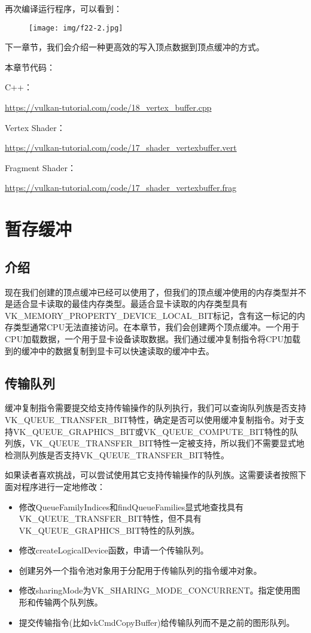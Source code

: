 \documentclass{ctexart}
\begin{document}
再次编译运行程序，可以看到：

\begin{figure}[H]
	\centering
	\texttt{[image: img/f22-2.jpg]}
\end{figure}

下一章节，我们会介绍一种更高效的写入顶点数据到顶点缓冲的方式。

本章节代码：

C++：

\url{https://vulkan-tutorial.com/code/18_vertex_buffer.cpp}

Vertex Shader：

\url{https://vulkan-tutorial.com/code/17_shader_vertexbuffer.vert}

Fragment Shader：

\url{https://vulkan-tutorial.com/code/17_shader_vertexbuffer.frag}

\newpage
\section{暂存缓冲}

\subsection{介绍}

现在我们创建的顶点缓冲已经可以使用了，但我们的顶点缓冲使用的内存类型并不是适合显卡读取的最佳内存类型。最适合显卡读取的内存类型具有VK\_MEMORY\_PROPERTY\_DEVICE\_LOCAL\_BIT标记，含有这一标记的内存类型通常CPU无法直接访问。在本章节，我们会创建两个顶点缓冲。一个用于CPU加载数据，一个用于显卡设备读取数据。我们通过缓冲复制指令将CPU加载到的缓冲中的数据复制到显卡可以快速读取的缓冲中去。

\subsection{传输队列}

缓冲复制指令需要提交给支持传输操作的队列执行，我们可以查询队列族是否支持VK\_QUEUE\_TRANSFER\_BIT特性，确定是否可以使用缓冲复制指令。对于支持VK\_QUEUE\_GRAPHICS\_BIT或VK\_QUEUE\_COMPUTE\_BIT特性的队列族，VK\_QUEUE\_TRANSFER\_BIT特性一定被支持，所以我们不需要显式地检测队列族是否支持VK\_QUEUE\_TRANSFER\_BIT特性。

如果读者喜欢挑战，可以尝试使用其它支持传输操作的队列族。这需要读者按照下面对程序进行一定地修改：

\begin{itemize}
	\item 修改QueueFamilyIndices和findQueueFamilies显式地查找具有VK\_QUEUE\_TRANSFER\_BIT特性，但不具有VK\_QUEUE\_GRAPHICS\_BIT特性的队列族。
	\item 修改createLogicalDevice函数，申请一个传输队列。
	\item 创建另外一个指令池对象用于分配用于传输队列的指令缓冲对象。
	\item 修改sharingMode为VK\_SHARING\_MODE\_CONCURRENT。指定使用图形和传输两个队列族。
	\item 提交传输指令(比如vkCmdCopyBuffer)给传输队列而不是之前的图形队列。
\end{itemize}
\end{document}
